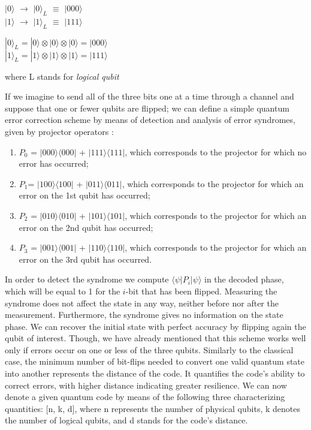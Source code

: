 \documentclass{Configuration_Files/PoliMi3i_thesis}
\begin{document}
\begin{center}
	$|0 \rangle$ $\rightarrow$ $|0 \rangle_L$ $\equiv$ $|000 \rangle$   \\
	$|1 \rangle$ $\rightarrow$ $|1 \rangle_L$ $\equiv$ $|111 \rangle$
\end{center}

\begin{center}
	$|0\rangle_L = |0\rangle \otimes |0\rangle \otimes |0\rangle = |000\rangle$ \\
	$|1\rangle_L = |1\rangle \otimes |1\rangle \otimes |1\rangle = |111\rangle$
\end{center}

where L stands for {\it logical qubit} 

If we imagine to send all of the three bits one at a time through a channel and suppose that one or fewer qubits are flipped; we can define a simple quantum error correction scheme by means of detection and analysis of error syndromes, given by projector operators \cite{Nie06}:

\begin{enumerate}
	\item  $P_0$ = $|000 \rangle \langle 000|$ + $|111 \rangle \langle 111|$, which corresponds to the projector for which no error has occurred;
	\item $P_1$= $|100 \rangle \langle 100|$ + $|011 \rangle \langle 011|$, which corresponds to the projector for which an error on the 1st qubit has occurred;
	\item $P_2$ = $|010 \rangle \langle 010|$ + $|101 \rangle \langle 101|$, which corresponds to the projector for which an error on the 2nd qubit has occurred;
	\item $P_3$ = $|001 \rangle \langle 001|$ + $|110 \rangle \langle 110|$, which corresponds to the projector for which an error on the 3rd qubit has occurred.
\end{enumerate}

In order to detect the syndrome we compute $\langle \psi| P_i | \psi \rangle $ in the decoded phase, which will be equal to 1 for the $i$-bit that has been flipped.
Measuring the syndrome does not affect the state in any way, neither before nor after the measurement. Furthermore, the syndrome gives no information on the state phase. We can recover the initial state with perfect accuracy by flipping again the qubit of interest. Though, we have already mentioned that this scheme works well only if errors occur on one or less of the three qubits.\newline
Similarly to the classical case, the minimum number of bit-flips needed to convert one valid quantum state into another represents the distance of the code. It quantifies the code's ability to correct errors, with higher distance indicating greater resilience.
We can now denote a given quantum code by means of the following three characterizing quantities: [n, k, d], where n represents the number of physical qubits, k denotes the number of logical qubits, and d stands for the code's distance. \newline
\end{document}
